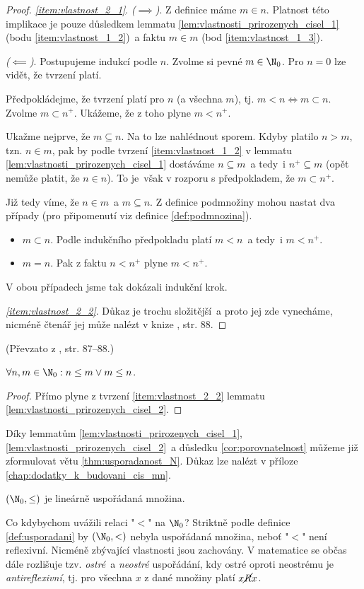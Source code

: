 \begin{proof}
    \textit{\ref{item:vlastnost_2_1}}. \textit{($\implies$)}. Z definice máme $m\in n$. Platnost této implikace je pouze důsledkem lemmatu \ref{lem:vlastnosti_prirozenych_cisel_1} (bodu \ref{item:vlastnost_1_2})~a faktu $m\in m$ (bod \ref{item:vlastnost_1_3}).\par
    \textit{($\impliedby$)}. Postupujeme indukcí podle $n$. Zvolme si pevné $m\in\N_0$. Pro $n=0$ lze vidět, že tvrzení platí.\par
    Předpokládejme, že tvrzení platí pro $n$ (a všechna $m$), tj. $m<n\iff m\subset n$. Zvolme $m\subset n^+$. Ukážeme, že z toho plyne $m<n^+$.\par
    Ukažme nejprve, že $m\subseteq n$. Na to lze nahlédnout sporem. Kdyby platilo $n>m$, tzn. $n\in m$, pak by podle tvrzení \ref{item:vlastnost_1_2} v lemmatu \ref{lem:vlastnosti_prirozenych_cisel_1} dostáváme $n\subseteq m$~a tedy~i $n^+\subseteq m$ (opět nemůže platit, že $n\in n$). To je~však v rozporu s předpokladem, že $m\subset n^+$.\par
    Již tedy víme, že $n\in m$~a $m\subseteq n$. Z definice podmnožiny mohou nastat dva případy (pro připomenutí viz definice \ref{def:podmnozina}).
    \begin{itemize}
        \item $m\subset n$. Podle indukčního předpokladu platí $m<n$~a tedy~i $m<n^+$.
        \item $m=n$. Pak z faktu $n<n^+$ plyne $m<n^+$.
    \end{itemize}
    V obou případech jsme tak dokázali indukční krok.\par
    \textit{\ref{item:vlastnost_2_2}}. Důkaz je trochu složitější~a proto jej zde vynecháme, nicméně čtenář jej může nalézt v knize \cite{BalcarStepanek1986}, str. 88.
\end{proof}
(Převzato z \cite{BalcarStepanek1986}, str. 87--88.)\par
\begin{corollary}\label{cor:porovnatelnost}
    $\forall n,m\in\N_0: n\leq m \lor m\leq n$.
\end{corollary}
\begin{proof}
    Přímo plyne z tvrzení \ref{item:vlastnost_2_2} lemmatu \ref{lem:vlastnosti_prirozenych_cisel_2}.
\end{proof}
Díky lemmatům \ref{lem:vlastnosti_prirozenych_cisel_1}, \ref{lem:vlastnosti_prirozenych_cisel_2}~a důsledku \ref{cor:porovnatelnost} můžeme již zformulovat větu \ref{thm:usporadanost_N}. Důkaz lze nalézt v příloze \ref{chap:dodatky_k_budovani_cis_mn}.
\begin{theorem}\label{thm:usporadanost_N}
    $(\N_0,\leq)$ je lineárně uspořádaná množina.
\end{theorem}
Co kdybychom uvážili relaci "$<$" na $\N_0$? Striktně podle definice \ref{def:usporadani} by $(\N_0,<)$ nebyla uspořádaná množina, neboť "$<$" není reflexivní. Nicméně zbývající vlastnosti jsou zachovány. V matematice se občas dále rozlišuje tzv. \emph{ostré}~a \emph{neostré} uspořádání, kdy ostré oproti neostrému je \emph{antireflexivní}, tj. pro všechna $x$ z dané množiny platí $x\cancel{R}x$.
